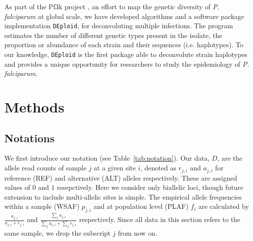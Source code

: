 \documentclass{bioinfo}
\begin{document}
As part of the Pf3k project \citep{Pf3k2016}, an effort to map the genetic diversity of {\it P. falciparum} at global scale, we have developed algorithms and a software package implementation \texttt{DEploid}, for deconvoluting multiple infections. The program estimates the number of different genetic types present in the isolate, the proportion or abundance of each strain and their sequences (i.e. haplotypes). To our knowledge, \texttt{DEploid} is the first package able to deconvolute strain haplotypes and provides a unique opportunity for researchers to study the epidemiology of {\it P. falciparum}.


\section{Methods}

\subsection{Notations}

We first introduce our notation (see Table~\ref{tab:notation}). Our data, $D$, are the allele read counts of sample $j$ at a given site $i$, denoted as $r_{j,i}$ and $a_{j,i}$ for reference (REF) and alternative (ALT) alleles respectively.  These are assigned values of $0$ and $1$ resepctively. Here we consider only biallelic loci, though future extension to include multi-allelic sites is simple.  The empirical allele frequencies within a sample (WSAF) $p_{j,i}$ and at population level (PLAF) $f_i$ are calculated by $ \frac{a_{j,i}}{a_{j,i} + r_{j,i}}$ and $ \frac{\sum_j a_{j,i}}{\sum_j a_{j,i} + \sum_j r_{j,i}}$ respectively. Since all data in this section refers to the same sample, we drop the subscript $j$ from now on.
\end{document}
